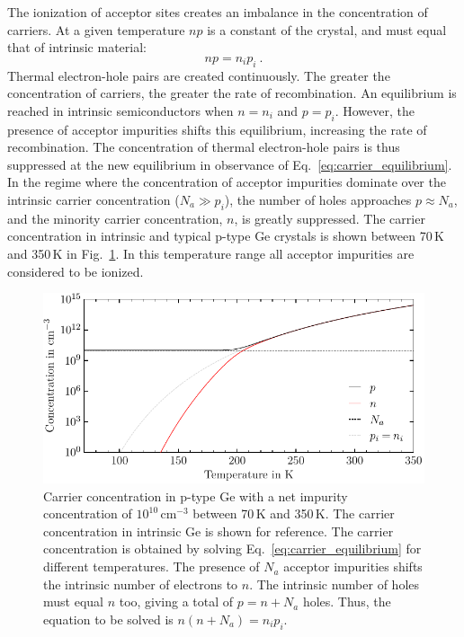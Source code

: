 The ionization of acceptor sites creates an imbalance in the concentration of carriers. At a given temperature $np$ is a constant of the crystal, and must equal that of intrinsic material:
\begin{equation}
	np = n_ip_i~.
	\label{eq:carrier_equilibrium}
\end{equation}
Thermal electron-hole pairs are created continuously. The greater the concentration of carriers, the greater the rate of recombination. An equilibrium is reached in intrinsic semiconductors when $n=n_i$ and $p = p_i$. However, the presence of acceptor impurities shifts this equilibrium, increasing the rate of recombination. The concentration of thermal electron-hole pairs is thus suppressed at the new equilibrium in observance of Eq.~\ref{eq:carrier_equilibrium}. In the regime where the concentration of acceptor impurities dominate over the intrinsic carrier concentration ($N_a \gg p_i$), the number of holes approaches $p \approx N_a$, and the minority carrier concentration, $n$, is greatly suppressed. The carrier concentration in intrinsic and typical p-type Ge crystals is shown between 70\,K and 350\,K in Fig.~\ref{fig:carriers}. In this temperature range all acceptor impurities are considered to be ionized.
\begin{figure}[htb]
	\centering
	\includegraphics[width=5in]{figs/ge/carriers_width_5in.pdf}
	\caption{Carrier concentration in p-type Ge with a net impurity concentration of $10^{10}$\,cm$^{-3}$ between 70\,K and 350\,K. The carrier concentration in intrinsic Ge is shown for reference. The carrier concentration is obtained by solving Eq.~\ref{eq:carrier_equilibrium} for different temperatures. The presence of $N_a$ acceptor impurities shifts the intrinsic number of electrons to $n$. The intrinsic number of holes must equal $n$ too, giving a total of $p = n+N_a$ holes. Thus, the equation to be solved is $n(n+N_a) = n_ip_i$.} 
	\label{fig:carriers}
\end{figure}

